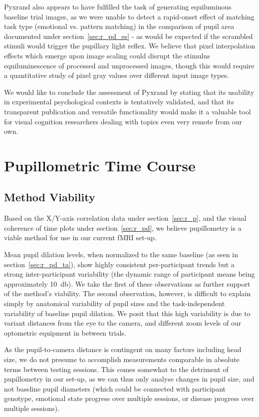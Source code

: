 	Pyxrand also appears to have fulfilled the task of generating equiluminous baseline trial images, as we were unable to detect a rapid-onset effect of matching task type (emotional vs. pattern matching) in the comparison of pupil area documented under section~\ref{sec:r_pd_es} -
	as would be expected if the scrambled stimuli would trigger the pupillary light reflex.
	We believe that pixel interpolation effects which emerge upon image scaling could disrupt the stimulus equiluminescence of processed and unprocessed images, though this would require a quantitative study of pixel gray values over different input image types.
	
	We would like to conclude the assessment of Pyxrand by stating that its usability in experimental psychological contexts is tentatively validated, and that its transparent publication and versatile functionality would make it a valuable tool for visual cognition researchers dealing with topics even very remote from our own.

    \section{Pupillometric Time Course}\label{sec:d_pd}
	\subsection{Method Viability}
	    Based on the X/Y-axis correlation data under section~\ref{sec:r_p}, and the visual coherence of time plots under section~\ref{sec:r_pd}, we believe pupillometry is a viable method for use in our current fMRI set-up.
	    
	    Mean pupil dilation levels, when normalized to the same baseline (as seen in section~\ref{sec:r_pd_ta}), show highly consistent per-participant trends but a strong inter-participant variability (the dynamic range of participant means being approximately \SI{10}{\decibel}).
	    We take the first of these observations as further support of the method's viability.
	    The second observation, however, is difficult to explain simply by anatomical variability of pupil sizes and the task-independent variability of baseline pupil dilation.
	    We posit that this high variability is due to variant distances from the eye to the camera, and different zoom levels of our optometric equipment in between trials.
	    
	    As the pupil-to-camera distance is contingent on many factors including head size, we do not presume to accomplish measurements comparable in absolute terms between testing sessions.
	    This comes somewhat to the detriment of pupillometry in our set-up, as we can thus only analyse changes in pupil size, and not baseline pupil diameters (which could be connected with participant genotype, emotional state progress over multiple sessions, or disease progress over multiple sessions).
